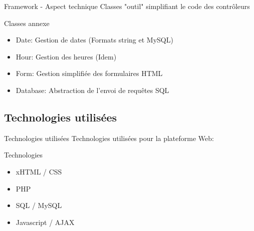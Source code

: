 \begin{frame}{Framework - Aspect technique}
    Classes "outil" simplifiant le code des contrôleurs
    \begin{block}{Classes annexe}
    \begin{itemize}
    \item Date: Gestion de dates (Formats string et MySQL)
    \item Hour: Gestion des heures (Idem)
    \item Form: Gestion simplifiée des formulaires HTML
    \item Database: Abstraction de l'envoi de requêtes SQL
    \end{itemize}
    \end{block}
\end{frame}

\subsection{Technologies utilisées}
\begin{frame}{Technologies utilisées}
    Technologies utilisées pour la plateforme Web:
    \begin{block}{Technologies}
    \begin{itemize}
    \item xHTML / CSS
    \item PHP
    \item SQL / MySQL
    \item Javascript / AJAX
    \end{itemize}
    \end{block}
\end{frame}
